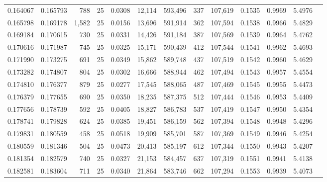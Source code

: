 \begin{tabular}{rrrrrrrrrrrrr}
0.164067 & 0.165793 &   788 &  25 &                                     0.0308 &  12,114 & 593,496 &     337 & 107,619 & 0.1535 & 0.9969 & 5.4976 \\
0.165798 & 0.169178 & 1,582 &  25 &                                     0.0156 &  13,696 & 591,914 &     362 & 107,594 & 0.1538 & 0.9966 & 5.4829 \\
0.169184 & 0.170615 &   730 &  25 &                                     0.0331 &  14,426 & 591,184 &     387 & 107,569 & 0.1539 & 0.9964 & 5.4762 \\
0.170616 & 0.171987 &   745 &  25 &                                     0.0325 &  15,171 & 590,439 &     412 & 107,544 & 0.1541 & 0.9962 & 5.4693 \\
0.171990 & 0.173275 &   691 &  25 &                                     0.0349 &  15,862 & 589,748 &     437 & 107,519 & 0.1542 & 0.9960 & 5.4629 \\
0.173282 & 0.174807 &   804 &  25 &                                     0.0302 &  16,666 & 588,944 &     462 & 107,494 & 0.1543 & 0.9957 & 5.4554 \\
0.174810 & 0.176377 &   879 &  25 &                                     0.0277 &  17,545 & 588,065 &     487 & 107,469 & 0.1545 & 0.9955 & 5.4473 \\
0.176379 & 0.177655 &   690 &  25 &                                     0.0350 &  18,235 & 587,375 &     512 & 107,444 & 0.1546 & 0.9953 & 5.4409 \\
0.177656 & 0.178739 &   592 &  25 &                                     0.0405 &  18,827 & 586,783 &     537 & 107,419 & 0.1547 & 0.9950 & 5.4354 \\
0.178741 & 0.179828 &   624 &  25 &                                     0.0385 &  19,451 & 586,159 &     562 & 107,394 & 0.1548 & 0.9948 & 5.4296 \\
0.179831 & 0.180559 &   458 &  25 &                                     0.0518 &  19,909 & 585,701 &     587 & 107,369 & 0.1549 & 0.9946 & 5.4254 \\
0.180559 & 0.181346 &   504 &  25 &                                     0.0473 &  20,413 & 585,197 &     612 & 107,344 & 0.1550 & 0.9943 & 5.4207 \\
0.181354 & 0.182579 &   740 &  25 &                                     0.0327 &  21,153 & 584,457 &     637 & 107,319 & 0.1551 & 0.9941 & 5.4138 \\
0.182581 & 0.183604 &   711 &  25 &                                     0.0340 &  21,864 & 583,746 &     662 & 107,294 & 0.1553 & 0.9939 & 5.4073 \\

\end{tabular}
